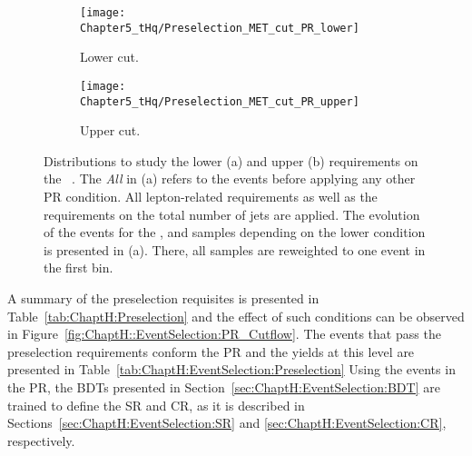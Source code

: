\begin{figure}[h]
\centering
\begin{subfigure}{.48\textwidth}
  \centering
  \texttt{[image: Chapter5\_tHq/Preselection\_MET\_cut\_PR\_lower]}
  \caption{Lower \MET cut.}
\end{subfigure}%
\begin{subfigure}{.52 \textwidth}
  \centering
  \texttt{[image: Chapter5\_tHq/Preselection\_MET\_cut\_PR\_upper]}
  \caption{Upper \MET cut.}
\end{subfigure}
\caption{Distributions to study the lower (a) and upper (b) requirements on the \MET~\cite{ThesisTanja}.
The \textit{All} in (a) refers to the events before applying any other PR condition.
All lepton-related requirements as well as the requirements on the total number of jets are applied. 
The evolution of the events for the \tHq, \ttbar and \Zjets samples depending on the lower \MET condition 
is presented in (a). There, all samples are reweighted to one event in the first bin.}
\label{fig:ChaptH::EventSelection:MetCondition}
\end{figure}


A summary of the preselection requisites is presented in
Table~\ref{tab:ChaptH:Preselection} and the effect of such conditions
can be observed in Figure~\ref{fig:ChaptH::EventSelection:PR_Cutflow}. 
The events that pass the preselection requirements
conform the  PR and the yields at this level are presented in Table~\ref{tab:ChaptH:EventSelection:Preselection}
Using the events in the PR, the BDTs presented
in Section~\ref{sec:ChaptH:EventSelection:BDT} are trained to define the SR and CR, 
as it is described in Sections~\ref{sec:ChaptH:EventSelection:SR} and \ref{sec:ChaptH:EventSelection:CR}, respectively. 


